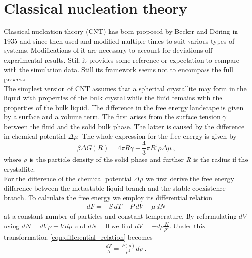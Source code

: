 

\section{Classical nucleation theory }
\label{sec:CNT}
Classical nucleation theory (CNT) has been proposed by Becker and Döring in 1935\cite{Becker1935} and since then used and modified multiple times to suit various types of systems. Modifications of it are necessary to account for deviations off experimental results. Still it provides some reference or expectation to compare with the simulation data. Still its framework seems not to encompass the full process.\\

The simplest version of CNT assumes that a spherical crystallite may form in the liquid with properties of the bulk crystal while the fluid remains with the properties of the bulk liquid. The difference in the free energy landscape is given by a surface and a volume term. The first arises from the surface tension $\gamma$ between the fluid and the solid bulk phase. The latter is caused by the difference in chemical potential $\Delta \mu$. The whole expression for the free energy is given by
\begin{equation}
\label{eqn:free_energy}
\beta \Delta G(R) =4 \pi R \gamma -\frac{4}{3} \pi R^3 \rho \Delta \mu  \; \text{,}
\end{equation}
where $\rho$ is the particle density of the solid phase and further $R$ is the radius if the crystallite.\\

For the difference of the chemical potential $\Delta \mu $ we first derive the free energy difference between the metastable liquid branch and the stable coexistence branch. To calculate the free energy we employ its differential relation
\begin{align}
\label{eqn:differential_relation}
dF = -S  \, dT -P \, dV + \mu  \, dN
\end{align}
at a constant number of particles and constant temperature. By reformulating $dV$ using $ dN = dV  \, \rho + V  \, d\rho  $ and $dN = 0 $ we find  $ dV = -d\rho \frac{N}{\rho^2}$. Under this transformation \autoref{eqn:differential_relation} becomes
\begin{align}
\label{eqn:df_relation}
\frac{dF}{N} = \frac{P(\rho)}{\rho^2} d\rho \; \text{.}
\end{align}

